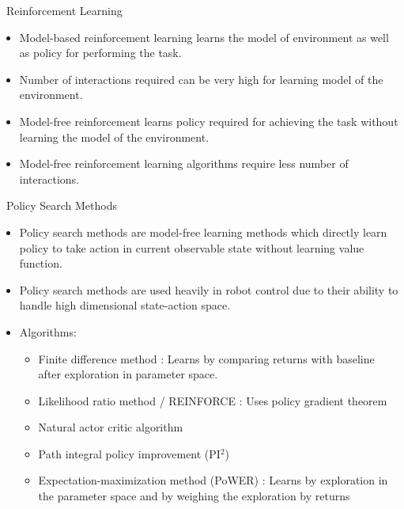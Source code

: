 \documentclass[aspectratio=43,10pt,fleqn,t]{beamer}
\begin{document}
\begin{frame}{~}{Reinforcement Learning}
	\begin{itemize}
		\item \textcolor{fhggreen}{Model-based} reinforcement learning learns the model of environment as well as policy for performing the task.
		\item Number of interactions required can be very high for learning model of the environment.
		\item \textcolor{fhggreen}{Model-free} reinforcement learns policy required for achieving the task without learning the model of the environment. 
		\item Model-free reinforcement learning algorithms require less number of interactions.
	\end{itemize}
\end{frame}

\begin{frame}{~}{Policy Search Methods}
	\begin{itemize}
		\item Policy search methods are model-free learning methods which directly learn policy to take action in current observable state without learning value function.
		\item Policy search methods are used heavily in robot control due to their ability to handle high dimensional state-action space.
		\item Algorithms:
		\begin{itemize}
			\small
			\item Finite difference method : Learns by comparing returns with baseline after exploration in parameter space.
			\item Likelihood ratio method / REINFORCE : Uses policy gradient theorem  
			\item Natural actor critic algorithm 
			\item Path integral policy improvement (PI$^{2}$)
			\item Expectation-maximization method (PoWER) : Learns by exploration in the parameter space and by weighing the exploration by returns
		\end{itemize} 

	\end{itemize}
\end{frame}
\end{document}
